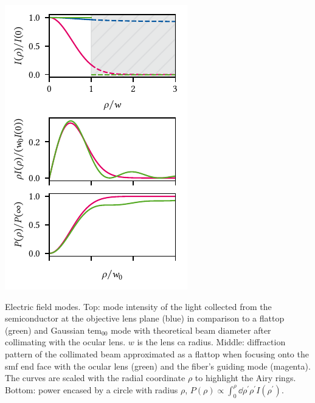 \begin{marginfigure}
    \centering
    \includegraphics{img/pdf/setup/modes_1d}
    \caption[]{
        Electric field modes.
        Top: mode intensity of the light collected from the semiconductor at the objective lens plane (blue) in comparison to a flattop (green) and Gaussian \acrshort{tem}$_{00}$ mode with theoretical beam diameter after collimating with the ocular lens.
        $w$ is the lens \gls{ca} radius.
        Middle: diffraction pattern of the collimated beam approximated as a flattop when focusing onto the \gls{smf} end face with the ocular lens (green) and the fiber's guiding mode (magenta).
        The curves are scaled with the radial coordinate $\rho$ to highlight the Airy rings.
        Bottom: power encased by a circle with radius $\rho$, $P(\rho)\propto\int_0^{\rho}\dd{\rho^\prime} \rho^{\prime} I(\rho^{\prime})$.
    }
    \label{fig:setup:optics:coupling:modes_1d}
\end{marginfigure}

